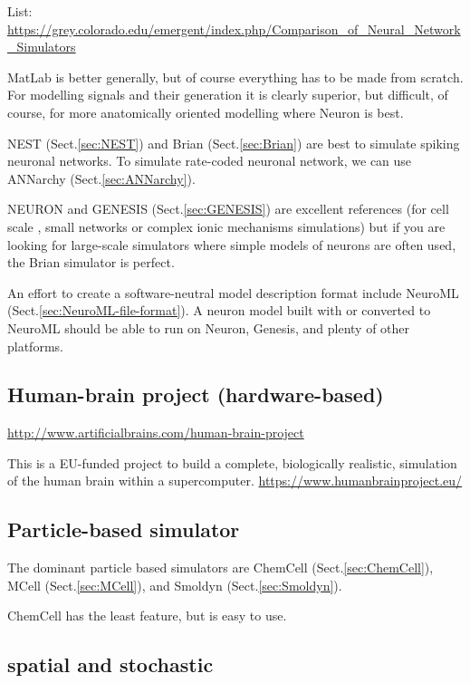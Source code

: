 List:
\url{https://grey.colorado.edu/emergent/index.php/Comparison_of_Neural_Network_Simulators}

MatLab is better generally, but of course everything has to be made from
scratch. For modelling signals and their generation it is clearly superior, but
difficult, of course, for more anatomically oriented modelling where Neuron is
best.

NEST (Sect.\ref{sec:NEST}) and Brian (Sect.\ref{sec:Brian}) are best to simulate
spiking neuronal networks. To simulate rate-coded neuronal network, we can use
ANNarchy (Sect.\ref{sec:ANNarchy}).

NEURON and GENESIS (Sect.\ref{sec:GENESIS}) are excellent references (for cell
scale , small networks or complex ionic mechanisms simulations) but if you are
looking for large-scale simulators where simple models of neurons are often
used, the Brian simulator is perfect.

An effort to create a software-neutral model description format include NeuroML
(Sect.\ref{sec:NeuroML-file-format}). A neuron model built with or converted to
NeuroML should be able to run on Neuron, Genesis, and plenty of other platforms.

\subsection{Human-brain project (hardware-based)}

\url{http://www.artificialbrains.com/human-brain-project}

This is a EU-funded project to
 build a complete, biologically realistic, simulation of the human brain within
a supercomputer.
\url{https://www.humanbrainproject.eu/}

\subsection{Particle-based simulator}
\label{sec:particle-based-simulator}

The  dominant  particle  based  simulators  are  ChemCell 
(Sect.\ref{sec:ChemCell}), MCell  (Sect.\ref{sec:MCell}),  and  Smoldyn
(Sect.\ref{sec:Smoldyn}).

ChemCell has the least feature, but is easy to use.

\subsection{spatial and stochastic}


